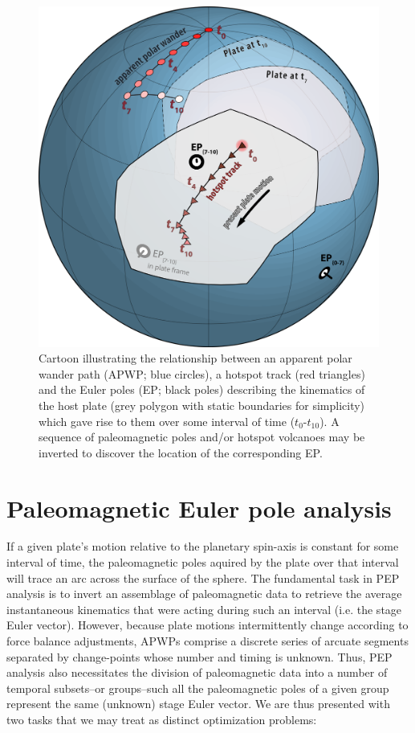 \documentclass{article} %
\begin{document}
\begin{figure}
\begin{centering}
\includegraphics[scale=0.25]{intro_cartoon.png}

\caption{\small Cartoon illustrating the relationship between an apparent polar wander path (APWP; blue circles), a hotspot track (red triangles) and the Euler poles (EP; black poles) describing the kinematics of the host plate (grey polygon with static boundaries for simplicity) which gave rise to them over some interval of time ($t_0$-$t_{10}$). A sequence of paleomagnetic poles and/or hotspot volcanoes may be inverted to discover the location of the corresponding EP.}

\label{fig:intro_cartoon}
\end{centering}
\end{figure}

\section{Paleomagnetic Euler pole analysis}

If a given plate's motion relative to the planetary spin-axis is constant for some interval of time, the paleomagnetic poles aquired by the plate over that interval will trace an arc across the surface of the sphere. The fundamental task in PEP analysis is to invert an assemblage of paleomagnetic data to retrieve the average instantaneous kinematics that were acting during such an interval (i.e. the stage Euler vector). However, because plate motions intermittently change according to force balance adjustments, APWPs comprise a discrete series of arcuate segments separated by change-points whose number and timing is unknown. Thus, PEP analysis also necessitates the division of paleomagnetic data into a number of temporal subsets--or groups--such all the paleomagnetic poles of a given group represent the same (unknown) stage Euler vector. We are thus presented with two tasks that we may treat as distinct optimization problems:
\end{document}
